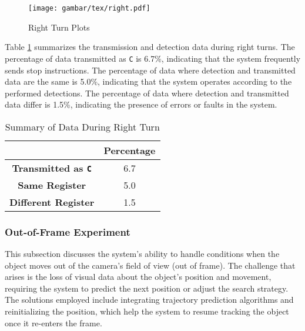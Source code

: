 \begin{figure}[H]
    \centering
    \texttt{[image: gambar/tex/right.pdf]}
    \caption{Right Turn Plots}
    \label{fig:right_turn_plots}
\end{figure}

Table \ref{tab:right_turn_data_transmission_detection} summarizes the transmission and detection data during right turns. The percentage of data transmitted as \texttt{C} is 6.7\%, indicating that the system frequently sends stop instructions. The percentage of data where detection and transmitted data are the same is 5.0\%, indicating that the system operates according to the performed detections. The percentage of data where detection and transmitted data differ is 1.5\%, indicating the presence of errors or faults in the system.

\begin{table}[H]
    \centering
    \caption{Summary of Data During Right Turn}
    \label{tab:right_turn_data_transmission_detection}
    \begin{tabular}{|c|c|}
        \hline 
        \cellcolor[HTML]{000000} & \cellcolor[HTML]{C0C0C0} \textbf{Percentage}   \\ \hline
        \cellcolor[HTML]{C0C0C0} \textbf{Transmitted as \texttt{C}} & 6.7  \\ \hline
        \cellcolor[HTML]{C0C0C0} \textbf{Same Register}  & 5.0  \\ \hline
        \cellcolor[HTML]{C0C0C0} \textbf{Different Register}   & 1.5  \\ \hline
    \end{tabular}
\end{table}

\vspace{5pt}
\subsubsection{Out-of-Frame Experiment}
\label{subsubsec:outofframeexperiment}

This subsection discusses the system's ability to handle conditions when the object moves out of the camera's field of view (out of frame). The challenge that arises is the loss of visual data about the object's position and movement, requiring the system to predict the next position or adjust the search strategy. The solutions employed include integrating trajectory prediction algorithms and reinitializing the position, which help the system to resume tracking the object once it re-enters the frame.

